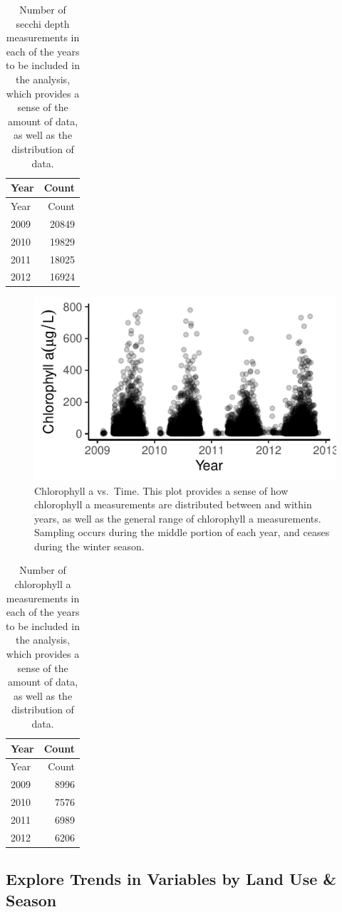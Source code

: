 \documentclass[12pt,]{article}
\begin{document}
\begin{longtable}[]{@{}lr@{}}
\caption{Number of secchi depth measurements in each of the years to be
included in the analysis, which provides a sense of the amount of data,
as well as the distribution of data.}\tabularnewline
\toprule
Year & Count\tabularnewline
\midrule
\endfirsthead
\toprule
Year & Count\tabularnewline
\midrule
\endhead
2009 & 20849\tabularnewline
2010 & 19829\tabularnewline
2011 & 18025\tabularnewline
2012 & 16924\tabularnewline
\bottomrule
\end{longtable}

\begin{figure}
\centering
\includegraphics{Bollt_Greif_Raby_Roth_Project_Final_files/figure-latex/unnamed-chunk-3-1.pdf}
\caption{Chlorophyll a vs.~Time. This plot provides a sense of how
chlorophyll a measurements are distributed between and within years, as
well as the general range of chlorophyll a measurements. Sampling occurs
during the middle portion of each year, and ceases during the winter
season.}
\end{figure}

\begin{longtable}[]{@{}lr@{}}
\caption{Number of chlorophyll a measurements in each of the years to be
included in the analysis, which provides a sense of the amount of data,
as well as the distribution of data.}\tabularnewline
\toprule
Year & Count\tabularnewline
\midrule
\endfirsthead
\toprule
Year & Count\tabularnewline
\midrule
\endhead
2009 & 8996\tabularnewline
2010 & 7576\tabularnewline
2011 & 6989\tabularnewline
2012 & 6206\tabularnewline
\bottomrule
\end{longtable}

\hypertarget{explore-trends-in-variables-by-land-use-season}{%
\subsection{Explore Trends in Variables by Land Use \&
Season}\label{explore-trends-in-variables-by-land-use-season}}
\end{document}
